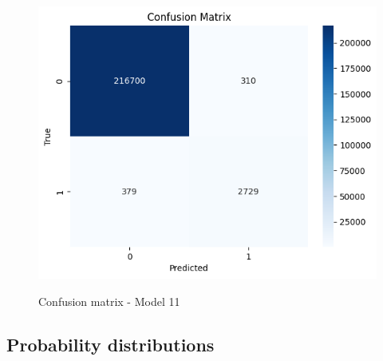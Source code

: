 \documentclass[12pt]{article}
\begin{document}
\begin{figure}
\begin{minipage}[c]{0.45\linewidth}
\includegraphics[width=1\textwidth]{Confusion_matrix_Model 11.png}\\
\caption{Confusion matrix - Model 11}
\end{minipage}
\hfill
\begin{minipage}[c]{0.45\linewidth}

\end{minipage}%
\end{figure}


\newpage
\subsection*{Probability distributions}
\end{document}
